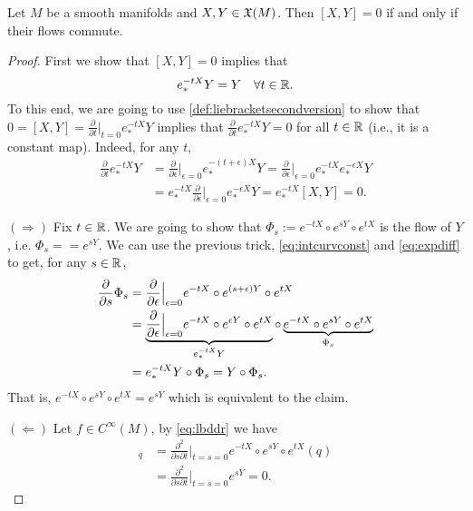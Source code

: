 \begin{proposition}
  Let $M$ be a smooth manifolds and $X,Y\in\mathfrak{X}(M)$. Then $[X,Y]=0$ if and only if their flows commute.
\end{proposition}
\begin{proof}
  First we show that $[X,Y] = 0$ implies that
  \begin{equation}\label{eq:intcurvconst}
    e^{-tX}_*Y = Y \quad \forall t\in\mathbb{R}.
  \end{equation}
  To this end, we are going to use \eqref{def:liebracketsecondversion} to show that $0 = [X,Y] = \frac{\partial}{\partial t}\Big|_{t=0} e_*^{-t X} Y$ implies that $\frac{\partial}{\partial t} e_*^{-t X} Y = 0$ for all $t\in\mathbb{R}$ (i.e., it is a constant map).
  Indeed, for any $t$,
  \begin{align}
    \frac{\partial}{\partial t} e_*^{-t X} Y
    &= \frac{\partial}{\partial \epsilon} \Big|_{\epsilon = 0} e_*^{-(t+\epsilon) X} Y
    = \frac{\partial}{\partial \epsilon} \Big|_{\epsilon = 0} e_*^{-t X}e_*^{-\epsilon X} Y\\
    &= e_*^{-tX} \frac{\partial}{\partial \epsilon} \Big|_{\epsilon = 0} e_*^{-\epsilon X} Y
    = e_*^{-tX} [X,Y] = 0.
  \end{align}
  
  $(\Longrightarrow)$ Fix $t\in\mathbb{R}$. We are going to show that $\Phi_s := e^{-tX}\circ e^{sY}\circ e^{tX}$ is the flow of $Y$, i.e. $\Phi_s = = e^{sY}$.
  We can use the previous trick, \eqref{eq:intcurvconst} and \eqref{eq:expdiff} to get, for any $s\in\mathbb{R}$,
  \begin{align}
    \frac{\partial}{\partial s} \Phi_s
    &= \frac{\partial}{\partial \epsilon} \Big|_{\epsilon = 0} e^{-tX}\circ e^{(s+\epsilon) Y}\circ e^{tX} \\
    &= \LaTeXunderbrace{\frac{\partial}{\partial \epsilon} \Big|_{\epsilon = 0} e^{-tX}\circ e^{\epsilon Y}\circ e^{tX}}_{e^{-tX}_* Y} \circ \LaTeXunderbrace{e^{-tX}\circ e^{s Y}\circ e^{tX}}_{\Phi_s} \\
    &= e^{-tX}_* Y \circ \Phi_s = Y \circ \Phi_s.
  \end{align}
  That is, $e^{-tX}\circ e^{sY}\circ e^{tX} = e^{sY}$ which is equivalent to the claim.

  $(\Longleftarrow)$ Let $f\in C^\infty(M)$, by \eqref{eq:lbddr} we have
  \begin{align}
    [X,Y]_q &= \frac{\partial^2}{\partial s \partial t}\Big|_{t=s=0}e^{-tX}\circ e^{sY}\circ e^{t X}(q)\\
    &= \frac{\partial^2}{\partial s \partial t}\Big|_{t=s=0} e^{sY} = 0.
  \end{align}
\end{proof}

